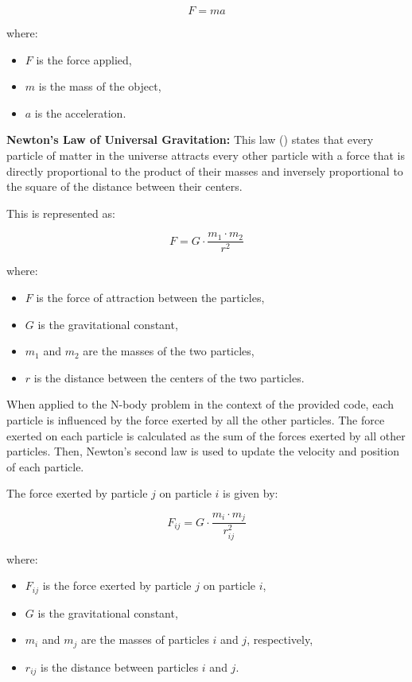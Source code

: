 \documentclass{solutionclass} %
\begin{document}
\[ F = ma \]

where:
\begin{itemize}
    \item  \( F \) is the force applied,
    \item  \( m \) is the mass of the object,
    \item  \( a \) is the acceleration.
\end{itemize}

\textbf{Newton's Law of Universal Gravitation:}
This law (\textbf{\textcite{newton1687mathematical}}) states that every particle of matter in the universe attracts every other particle with a force that is directly proportional to the product of their masses and inversely proportional to the square of the distance between their centers.

This is represented as:

\[ F = G \cdot \frac{{m_1 \cdot m_2}}{{r^2}} \]

where:
\begin{itemize}
    \item \( F \) is the force of attraction between the particles,
    \item \( G \) is the gravitational constant,
    \item \( m_1 \) and \( m_2 \) are the masses of the two particles,
    \item \( r \) is the distance between the centers of the two particles.
\end{itemize}

When applied to the N-body problem in the context of the provided code, each particle is influenced by the force exerted by all the other particles. The force exerted on each particle is calculated as the sum of the forces exerted by all other particles. Then, Newton's second law is used to update the velocity and position of each particle.

The force exerted by particle \( j \) on particle \( i \) is given by:

\[ F_{ij} = G \cdot \frac{{m_i \cdot m_j}}{{r_{ij}^2}} \]

where:
\begin{itemize}
    \item \( F_{ij} \) is the force exerted by particle \( j \) on particle \( i \),
    \item \( G \) is the gravitational constant,
    \item \( m_i \) and \( m_j \) are the masses of particles \( i \) and \( j \), respectively,
    \item \( r_{ij} \) is the distance between particles \( i \) and \( j \).

\end{itemize}
\end{document}
